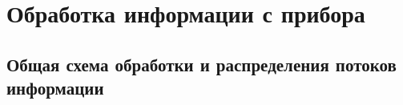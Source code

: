 \chapter{Обработка информации с прибора} \label{chapt3}
\section{Общая схема обработки и распределения потоков информации}